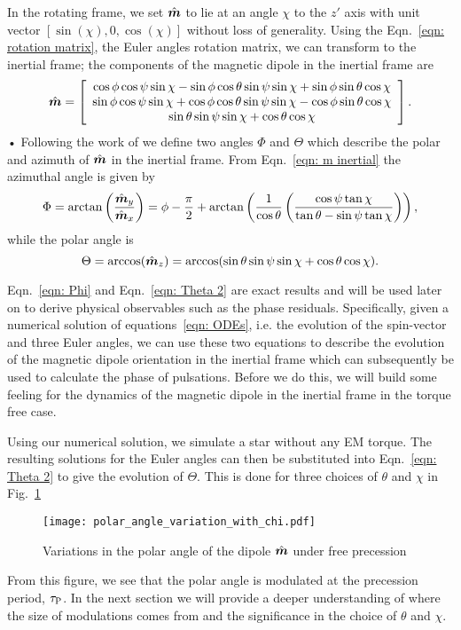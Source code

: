 \documentclass[../full_thesis/full_thesis.tex]{subfiles}
\begin{document}
In the rotating frame, we set $\hat{\boldsymbol{m}}$ to lie at an angle $\chi$ to the $z'$ axis
with unit vector $[\sin(\chi), 0, \cos(\chi)]$ without loss of generality.
Using the Eqn.~\eqref{eqn: rotation matrix}, the Euler angles
rotation matrix, we can transform to the inertial frame; the components of the
magnetic dipole in the inertial frame are
\begin{equation}
\hat{\boldsymbol{m}} =
\left[\begin{array}{c}
\cos\phi\cos\psi\sin\chi - \sin\phi \cos \theta \sin \psi \sin \chi
+ \sin \phi \sin \theta \cos \chi \\
\sin\phi\cos\psi\sin\chi + \cos\phi \cos \theta \sin \psi \sin \chi
- \cos \phi \sin \theta \cos \chi \\
\sin\theta \sin\psi \sin\chi + \cos\theta \cos \chi
\end{array}\right].
\label{eqn: m inertial}
\end{equation}•
Following the work of \citet{Jones2001} we define two angles $\Phi$ and $\Theta$
which describe the polar and azimuth of $\hat{\boldsymbol{m}}$ in the inertial frame.
From Eqn.~\eqref{eqn: m inertial} the azimuthal angle is given by
\begin{equation}
    \Phi = \arctan\left(\frac{\hat{\boldsymbol{m}}_{y}}{\hat{\boldsymbol{m}}_{x}}\right) =
\phi - \frac{\pi}{2} + \arctan\left(\frac{1}{\cos\theta}
                       \left(\frac{\cos\psi \tan \chi}{\tan\theta -
                       \sin \psi \tan\chi }\right)\right),
\label{eqn: Phi}
\end{equation}
while the polar angle is
\begin{equation}
\Theta = \arccos(\hat{\boldsymbol{m}}_{z}) = \arccos(\sin \theta \sin \psi \sin \chi + \cos \theta \cos \chi ).
\label{eqn: Theta 2}
\end{equation}

Eqn.~\eqref{eqn: Phi} and Eqn.~\eqref{eqn: Theta 2} are exact results and will
be used later on to derive physical observables such as the phase residuals.
Specifically, given a numerical solution of equations~\eqref{eqn: ODEs}, i.e.
the evolution of the spin-vector and three Euler angles, we can use these two
equations to describe the evolution of the magnetic dipole orientation in the
inertial frame which can subsequently be used to calculate the phase of
pulsations. Before we do this, we will build some feeling for the dynamics of
the magnetic dipole in the inertial frame in the torque free case.

Using our numerical solution, we simulate a star without any EM torque. The
resulting solutions for the Euler angles can then be substituted into Eqn.~\eqref{eqn: Theta 2}
to give the evolution of $\Theta$. This is done for three choices of $\theta$
and $\chi$ in Fig.~\ref{fig: polar angle variations}
\begin{figure}[htb]
\centering
  \texttt{[image: polar\_angle\_variation\_with\_chi.pdf]}
\caption{Variations in the polar angle of the dipole $\hat{\boldsymbol{m}}$ under free precession}
\label{fig: polar angle variations}
\end{figure}
From this figure, we see that the polar angle is modulated at the precession
period, $\tau_{\mathrm{P}}$. In the next section we will provide a deeper understanding
of where the size of modulations comes from and the significance in the choice
of $\theta$ and $\chi$.
\end{document}
